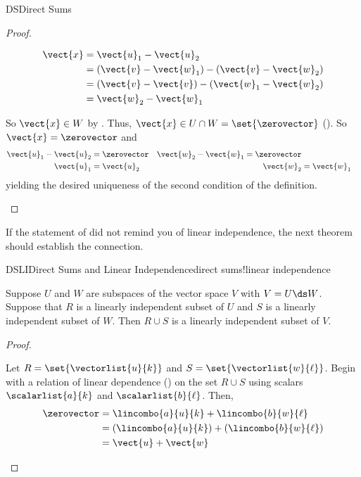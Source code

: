 \begin{subsect}{DS}{Direct Sums}
\begin{proof}
\begin{para}
%
\begin{align*}
\vect{x}
&=\vect{u}_1-\vect{u}_2\\
&=\left(\vect{v}-\vect{w}_1\right)-\left(\vect{v}-\vect{w}_2\right)\\
&=\left(\vect{v}-\vect{v}\right)-\left(\vect{w}_1-\vect{w}_2\right)\\
&=\vect{w}_2-\vect{w}_1
\end{align*}
\end{para}
%
\begin{para}So $\vect{x}\in W$ by .  Thus, $\vect{x}\in U\cap W =\set{\zerovector}$ ().  So $\vect{x}=\zerovector$ and
%
\begin{align*}
\vect{u}_1-\vect{u}_2&=\zerovector & \vect{w}_2-\vect{w}_1 = \zerovector\\
\vect{u}_1&=\vect{u}_2 & \vect{w}_2&=\vect{w}_1\\
\end{align*}
%
yielding the desired uniqueness of the second condition of the definition.\end{para}
\end{proof}
%
\begin{para}If the statement of  did not remind you of linear independence, the next theorem should establish the connection.\end{para}
%
\begin{theorem}{DSLI}{Direct Sums and Linear Independence}{direct sums!linear independence}
\begin{para}Suppose $U$ and $W$ are subspaces of the vector space $V$ with $V=U\ds W$.  Suppose that $R$ is a linearly independent subset of $U$ and $S$ is a linearly independent subset of $W$.  Then $R\cup S$ is a linearly independent subset of $V$.\end{para}
\end{theorem}
%
\begin{proof}
\begin{para}Let $R=\set{\vectorlist{u}{k}}$ and $S=\set{\vectorlist{w}{\ell}}$.  Begin with a relation of linear dependence () on the set $R\cup S$ using scalars $\scalarlist{a}{k}$ and $\scalarlist{b}{\ell}$.  Then,
%
\begin{align*}
\zerovector
&=
\lincombo{a}{u}{k}
+
\lincombo{b}{w}{\ell}\\
&=
\left(\lincombo{a}{u}{k}\right)
+
\left(\lincombo{b}{w}{\ell}\right)\\
&=\vect{u}+\vect{w}
\end{align*}

\end{para}
\end{proof}
\end{subsect}
